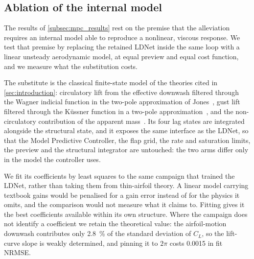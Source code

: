 %

\subsection{Ablation of the internal model}
\label{subsec:ablation}

The results of \cref{subsec:mpc_results} rest on the premise that the
alleviation requires an internal model able to reproduce a nonlinear,
viscous response. We test that premise by replacing the retained LDNet
inside the same loop with a linear unsteady aerodynamic model, at equal
preview and equal cost function, and we measure what the substitution costs.

The substitute is the classical finite-state model of the theories cited in
\cref{sec:introduction}: circulatory lift from the effective downwash
filtered through the Wagner indicial function in the two-pole approximation
of Jones~\cite{Jones1940}, gust lift filtered through the K\"ussner
function in a two-pole approximation~\cite{hoblit1988gust}, and the
non-circulatory contribution of the apparent mass~\cite{Theodorsen}. Its
four lag states are integrated alongside the structural state, and it
exposes the same interface as the LDNet, so that the Model Predictive
Controller, the flap grid, the rate and saturation limits, the preview and
the structural integrator are untouched: the two arms differ only in the
model the controller uses.

We fit its coefficients by least squares to the same campaign that trained
the LDNet, rather than taking them from thin-airfoil theory. A linear model
carrying textbook gains would be penalised for a gain error instead of for
the physics it omits, and the comparison would not measure what it claims
to. Fitting gives it the best coefficients available within its own
structure. Where the campaign does not identify a coefficient we retain the
theoretical value: the airfoil-motion downwash contributes only
\SI{2.8}{\percent} of the standard deviation of $C_L$, so the lift-curve
slope is weakly determined, and pinning it to $2\pi$ costs \num{0.0015} in
fit NRMSE.

